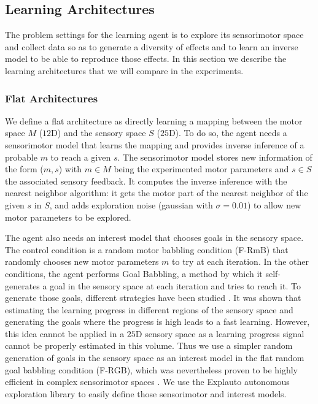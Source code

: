 \documentclass[10pt,letterpaper]{article}
\begin{document}
		
	
	\subsection{Learning Architectures}

		The problem settings for the learning agent is to explore its sensorimotor space and collect data so as to generate a diversity of effects and to learn an inverse model to 
		be able to reproduce those effects.
		In this section we describe the learning architectures that we will compare in the experiments.
		
		\subsubsection{Flat Architectures}
			
			We define a flat architecture as directly learning a mapping between the motor space $M$ ($12$D) and the sensory space $S$ ($25$D).
			To do so, the agent needs a sensorimotor model that learns the mapping and provides inverse inference of a probable $m$ to reach a given $s$.
			The sensorimotor model stores new information of the form ($m, s$) with $m \in M$ being the experimented motor parameters and $s \in S$ the associated sensory feedback. 
			It computes the inverse inference with the nearest neighbor algorithm: 
			it gets the motor part of the nearest neighbor of the given $s$ in $S$, and adds exploration noise (gaussian with $\sigma=0.01$) to allow new motor parameters to be explored.
			
			The agent also needs an interest model that chooses goals in the sensory space.
			The control condition is a random motor babbling condition (F-RmB) that randomly chooses new motor parameters $m$ to try at each iteration.
			In the other conditions, the agent performs Goal Babbling, a method by which it self-generates a goal in the sensory space at each iteration and tries to reach it.
			To generate those goals, different strategies have been studied \cite{baranes_active_2013}. 
			It was shown that estimating the learning progress in different regions of the sensory space and generating the goals where the progress is high leads to a fast learning.
			However, this idea cannot be applied in a $25$D sensory space as a learning progress signal cannot be properly estimated in this volume.
			Thus we use a simpler random generation of goals in the sensory space as an interest model in the flat random goal babbling condition (F-RGB), 
			which was nevertheless proven to be highly efficient in complex sensorimotor spaces \cite{rolf}.
			We use the Explauto autonomous exploration library \cite{moulin-frier_explauto:_2014} to easily define those sensorimotor and interest models.
			
\end{document}
